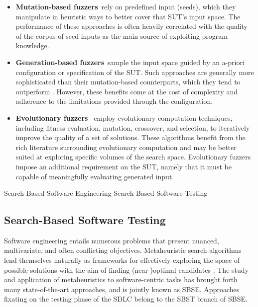 \begin{itemize}
\item \textbf{Mutation-based fuzzers}~rely on predefined input (seeds),
which they manipulate in heuristic ways to better cover that \gls{SUT}'s input space.
The performance of these approaches is often heavily correlated
with the quality of the corpus of seed inputs as the main source
of exploiting program knowledge.


\item \textbf{Generation-based fuzzers}~sample the input space
guided by an a-priori configuration or specification of the \gls{SUT}.
Such approaches are generally more sophisticated than their mutation-based
counterparts, which they tend to outperform \cite{saavedra2019review}.
However, these benefits come at the cost of complexity and
adherence to the limitations provided through the configuration.

\item \textbf{Evolutionary fuzzers}~ employ evolutionary computation
techniques, including fitness evaluation, mutation, crossover, and selection,
to iteratively improve the quality of a set of solutions.
These algorithms benefit from the rich literature surrounding
evolutionary computation and may be better suited at exploring
specific volumes of the search space.
Evolutionary fuzzers impose an additional requirement on the \gls{SUT},
namely that it must be capable of meaningfully evaluating generated input.
\end{itemize}

 {Search-Based Software Engineering}
 {Search-Based Software Testing}

\subsection{Search-Based Software Testing}

Software engineering entails numerous problems that present
nuanced, multivariate, and often conflicting objectives.
Metaheuristic search algorithms lend themselves naturally
as frameworks for effectively exploring the space of possible
solutions with the aim of finding (near-)optimal candidates \cite{harman2001search}.
The study and application of metaheuristics to software-centric tasks
has brought forth many state-of-the-art approaches, and is jointly known
as \Gls{SBSE}.
Approaches fixating on the testing phase of the \gls{SDLC}
belong to the \gls{SBST} branch of \gls{SBSE}.

